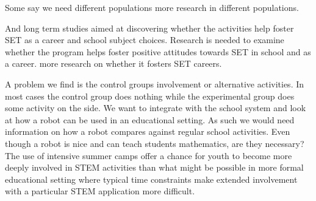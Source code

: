 \bigskip\noindent
Some say we need different populations
\cite{barker2007robotics} more research in different populations. 

\bigskip\noindent
And long term studies aimed at discovering whether the activities help foster SET as a career and school subject choices. 
\cite{barker2007robotics} Research is needed to examine whether the program helps foster positive attitudes towards SET in school and as a career.
\cite{barker2007robotics} more research on whether it fosters SET careers. 

\bigskip\noindent
A problem we find is the control groups involvement or alternative activities. In most cases the control group does nothing while the experimental group does some activity on the side. We want to integrate with the school system and look at how a robot can be used in an educational setting. As such we would need information on how a robot compares against regular school activities. Even though a robot is nice and can teach students mathematics, are they necessary?
\cite{nugent2009use} The use of intensive summer camps offer a chance for youth to become more deeply involved in STEM activities than what might be possible in more formal educational setting where typical time constraints make extended involvement with a particular STEM application more difficult.